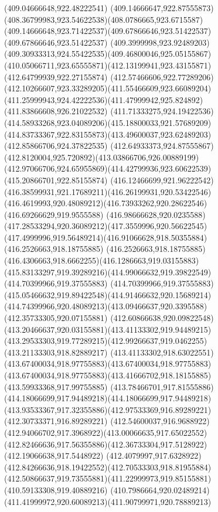 {{		\moveto(409.04666648,922.48222541)
		\curveto(409.14666647,922.87555873)(408.36799983,923.54622538)(408.0786665,923.6715587)
		\curveto(409.14666648,923.71422537)(409.67866646,923.51422537)(409.67866646,923.51422537)
		\curveto(409.3999998,923.92489203)(409.30933313,924.55422535)(409.46800046,925.05155867)
		\curveto(410.05066711,923.65555871)(412.13199941,923.43155871)(412.64799939,922.27155874)
		\curveto(412.57466606,922.77289206)(412.10266607,923.33289205)(411.55466609,923.66089204)
		\curveto(411.25999943,924.42222536)(411.47999942,925.824892)(411.83866608,926.21022532)
		\curveto(411.71333275,924.19422536)(414.58933268,923.04089206)(415.18800033,921.57689209)
		\curveto(414.83733367,922.83155873)(413.49600037,923.62489203)(412.85866706,924.37822535)
		\curveto(412.64933373,924.87555867)(412.8120004,925.720892)(413.03866706,926.00889199)
		\curveto(412.97066706,924.65955869)(414.42799936,923.60622539)(415.20866701,922.85155874)
		\curveto(416.12466699,921.96222542)(416.38599931,921.17689211)(416.26199931,920.53422546)
		\curveto(416.4619993,920.48089212)(416.73933262,920.28622546)(416.69266629,919.9555588)
		\curveto(416.98666628,920.0235588)(417.28533294,920.36089212)(417.3559996,920.56622545)
		\curveto(417.4999996,919.56489214)(416.91066628,918.50355884)(416.2526663,918.18755885)
		\curveto(416.2526663,918.18755885)(416.4306663,918.6662255)(416.1286663,919.03155883)
		\curveto(415.83133297,919.39289216)(414.99066632,919.39822549)(414.70399966,919.37555883)
		\curveto(414.70399966,919.37555883)(415.05466632,919.89422548)(414.91466632,920.15689214)
		\curveto(414.74399966,920.48089213)(413.09466637,920.3395588)(412.35733305,920.07155881)
		\curveto(412.60866638,920.09822548)(413.20466637,920.03155881)(413.41133302,919.94489215)
		\curveto(413.29533303,919.77289215)(412.99266637,919.0462255)(413.21133303,918.82889217)
		\curveto(413.41133302,918.63022551)(413.67400034,918.97755883)(413.67400034,918.97755883)
		\curveto(413.67400034,918.97755883)(413.41666702,918.18155885)(413.59933368,917.99755885)
		\curveto(413.78466701,917.81555886)(414.18066699,917.94489218)(414.18066699,917.94489218)
		\curveto(413.93533367,917.32355886)(412.97533369,916.89289221)(412.30733371,916.89289221)
		\curveto(412.54600037,916.9688922)(412.94066702,917.3968922)(413.00066635,917.65022552)
		\curveto(412.82466636,917.56355886)(412.36733304,917.5128922)(412.19066638,917.5448922)
		\curveto(412.4079997,917.6328922)(412.84266636,918.19422552)(412.70533303,918.81955884)
		\curveto(412.50866637,919.73555881)(411.22999973,919.85155881)(410.59133308,919.40889216)
		\curveto(410.7986664,920.02489214)(411.41999972,920.60089213)(411.90799971,920.78889213)
}}
